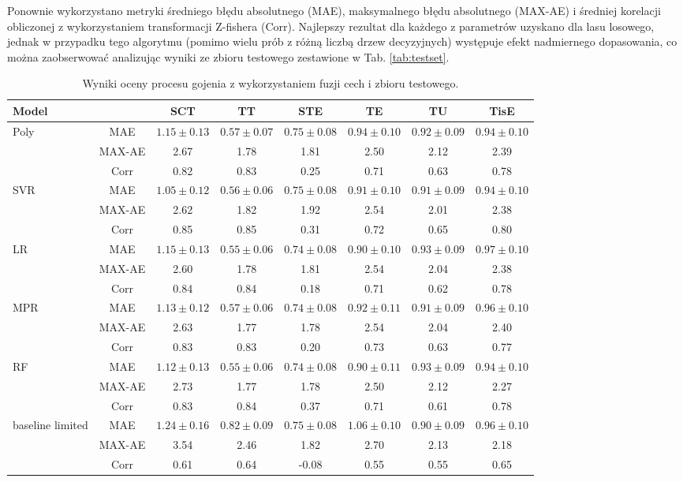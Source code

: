Ponownie wykorzystano metryki średniego błędu absolutnego (MAE), maksymalnego błędu absolutnego (MAX-AE) i średniej korelacji obliczonej z wykorzystaniem transformacji Z-fishera (Corr). Najlepszy rezultat dla każdego z parametrów uzyskano dla lasu losowego, jednak w przypadku tego algorytmu (pomimo wielu prób z różną liczbą drzew decyzyjnych) występuje efekt nadmiernego dopasowania, co można zaobserwować analizując wyniki ze zbioru testowego zestawione w Tab. \ref{tab:testset}. 

\begin{table}[h]
	\caption{Wyniki oceny procesu gojenia z wykorzystaniem fuzji cech i zbioru testowego.}
	\scriptsize
	\begin{center}
		\begin{tabular}{lc||c|c|c|c|c|c}
			\textbf{Model} & & \textbf{SCT} & \textbf{TT} & \textbf{STE} & \textbf{TE} & \textbf{TU} & \textbf{TisE}\\ 
			
			\hline
			\multirow{3}{*}{Poly}
			& MAE & $1.15\pm0.13$ & $0.57\pm0.07$ & $0.75\pm0.08$ & $0.94\pm0.10$ & $0.92\pm0.09$ & $0.94\pm0.10$\\
			& MAX-AE & 2.67 & 1.78 & 1.81 & 2.50 & 2.12 & 2.39 \\
			& Corr   & 0.82 & 0.83 & 0.25 & 0.71 & 0.63 & 0.78 \\
			\hline
			\multirow{3}{*}{SVR}
			& MAE & $1.05\pm0.12$ & $0.56\pm0.06$ & $0.75\pm0.08$ & $0.91\pm0.10$ & $0.91\pm0.09$ & $0.94\pm0.10$\\
			& MAX-AE & 2.62 & 1.82 & 1.92 & 2.54 & 2.01 & 2.38 \\
			& Corr   & 0.85 & 0.85 & 0.31 & 0.72 & 0.65 & 0.80 \\
			\hline
			\multirow{3}{*}{LR}
			& MAE & $1.15\pm0.13$ & $0.55\pm0.06$ & $0.74\pm0.08$ & $0.90\pm0.10$ & $0.93\pm0.09$ & $0.97\pm0.10$\\
			& MAX-AE & 2.60 & 1.78 & 1.81 & 2.54 & 2.04 & 2.38 \\
			& Corr   & 0.84 & 0.84 & 0.18 & 0.71 & 0.62 & 0.78 \\
			\hline
			\multirow{3}{*}{MPR}
			& MAE & $1.13\pm0.12$ & $0.57\pm0.06$ & $0.74\pm0.08$ & $0.92\pm0.11$ & $0.91\pm0.09$ & $0.96\pm0.10$\\
			& MAX-AE & 2.63 & 1.77 & 1.78 & 2.54 & 2.04 & 2.40 \\
			& Corr   & 0.83 & 0.83 & 0.20 & 0.73 & 0.63 & 0.77 \\			
			\hline
			\multirow{3}{*}{RF}
			& MAE & $1.12\pm0.13$ & $0.55\pm0.06$ & $0.74\pm0.08$ & $0.90\pm0.11$ & $0.93\pm0.09$ & $0.94\pm0.10$\\
			& MAX-AE & 2.73 & 1.77 & 1.78 & 2.50 & 2.12 & 2.27 \\
			& Corr   & 0.83 & 0.84 & 0.37 & 0.71 & 0.61 & 0.78 \\
			\hline
			\multirow{3}{*}{baseline limited} 
			& MAE & $1.24\pm{0.16}$ & $0.82\pm{0.09}$ & $0.75\pm{0.08}$ & $1.06\pm{0.10}$ & $0.90\pm{0.09}$ & $0.96\pm{0.10}$ \\
			&MAX-AE & 3.54 & 2.46 & 1.82 & 2.70 & 2.13 & 2.18\\
			&Corr   & 0.61 & 0.64 &-0.08 & 0.55 & 0.55 & 0.65\\


\end{tabular}
\end{center}
\end{table}
